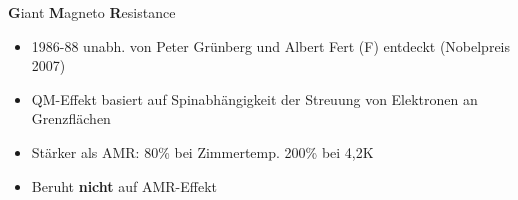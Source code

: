 \begin{frame}{\textbf{G}iant \textbf{M}agneto \textbf{R}esistance}{}





	\begin{block}{}
	    \begin{itemize}
	      \item 1986-88 unabh. von Peter Grünberg und Albert Fert (F) entdeckt (Nobelpreis 2007)
	      \item QM-Effekt basiert auf Spinabhängigkeit der Streuung von Elektronen an Grenzflächen
	    \end{itemize}
    \end{block}
	\begin{exampleblock}{}
    	\begin{itemize}
          \item Stärker als AMR: 80\% bei Zimmertemp. 200\% bei 4,2K
          \item Beruht \textbf{nicht} auf AMR-Effekt
        \end{itemize}
    \end{exampleblock}
\end{frame}



